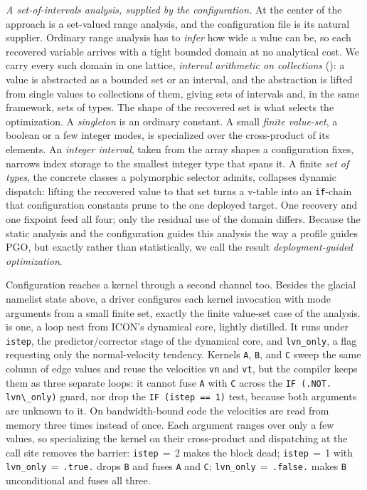 \textit{A set-of-intervals analysis, supplied by the configuration.}
At the center of the approach is a set-valued range analysis, and the configuration file is its natural supplier. Ordinary range analysis has to \emph{infer} how wide a value can be, so each recovered variable arrives with a tight bounded domain at no analytical cost. We carry every such domain in one lattice, \emph{interval arithmetic on collections} (): a value is abstracted as a bounded set or an interval, and the abstraction is lifted from single values to collections of them, giving sets of intervals and, in the same framework, sets of types. The shape of the recovered set is what selects the optimization. A \emph{singleton} is an ordinary constant. A small \emph{finite value-set}, a boolean or a few integer modes, is specialized over the cross-product of its elements. An \emph{integer interval}, taken from the array shapes a configuration fixes, narrows index storage to the smallest integer type that spans it. A finite \emph{set of types}, the concrete classes a polymorphic selector admits, collapses dynamic dispatch: lifting the recovered value to that set turns a v-table into an \lstinline[style=fortran]|if|-chain that configuration constants prune to the one deployed target. One recovery and one fixpoint feed all four; only the residual use of the domain differs. Because the static analysis and the configuration guides this analysis the way a profile guides PGO, but exactly rather than statistically, we call the result \emph{deployment-guided optimization}.


Configuration reaches a kernel through a second channel too. Besides the glacial namelist state above, a driver configures each kernel invocation with mode arguments from a small finite set, exactly the finite value-set case of the analysis.  is one, a loop nest from ICON's dynamical core, lightly distilled. It runs under \texttt{istep}, the predictor/corrector stage of the dynamical core, and \texttt{lvn\_only}, a flag requesting only the normal-velocity tendency. Kernels \texttt{A}, \texttt{B}, and \texttt{C} sweep the same column of edge values and reuse the velocities \texttt{vn} and \texttt{vt}, but the compiler keeps them as three separate loops: it cannot fuse \texttt{A} with \texttt{C} across the \lstinline[style=fortran]|IF (.NOT. lvn\_only)| guard, nor drop the \lstinline[style=fortran]|IF (istep == 1)| test, because both arguments are unknown to it. On bandwidth-bound code the velocities are read from memory three times instead of once. Each argument ranges over only a few values, so specializing the kernel on their cross-product and dispatching at the call site removes the barrier: \texttt{istep}\,$=$\,2 makes the block dead; \texttt{istep}\,$=$\,1 with \texttt{lvn\_only}\,$=$\,\texttt{.true.} drops \texttt{B} and fuses \texttt{A} and \texttt{C}; \texttt{lvn\_only}\,$=$\,\texttt{.false.} makes \texttt{B} unconditional and fuses all three.

